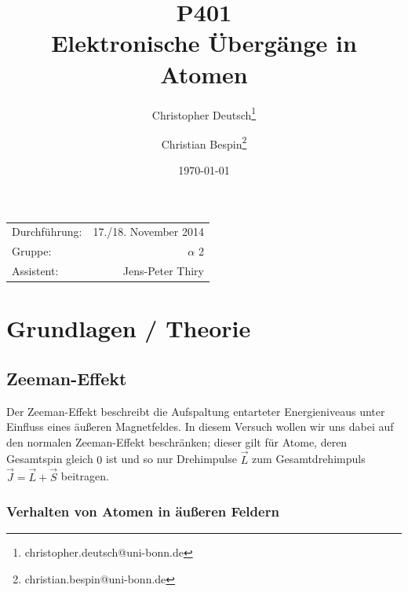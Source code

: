 \documentclass[11pt, a4paper]{article}
\title{P401 \\ Elektronische Übergänge in Atomen}
\author{Christopher Deutsch\footnote{christopher.deutsch@uni-bonn.de} \and Christian Bespin\footnote{christian.bespin@uni-bonn.de}}
\date{\today}
\begin{document}
\begin{titlepage}

\maketitle

\begin{center}
\begin{tabular}{l r}
Durchführung: & 17./18. November 2014 \\
Gruppe: & $\alpha$ 2 \\
Assistent: & Jens-Peter Thiry
\end{tabular}
\end{center}

\begin{abstract}
\noindent
\end{abstract}

\end{titlepage}

\tableofcontents
\newpage


\section{Grundlagen / Theorie}

\subsection{Zeeman-Effekt}

Der Zeeman-Effekt beschreibt die Aufspaltung entarteter Energieniveaus unter Einfluss eines äußeren Magnetfeldes.
In diesem Versuch wollen wir uns dabei auf den normalen Zeeman-Effekt beschränken; dieser gilt für Atome, deren Gesamtspin gleich $0$ ist und so nur Drehimpulse $\vec{L}$ zum Gesamtdrehimpuls $\vec{J}=\vec{L}+\vec{S}$ beitragen.

\subsubsection{Verhalten von Atomen in äußeren Feldern}
\end{document}
